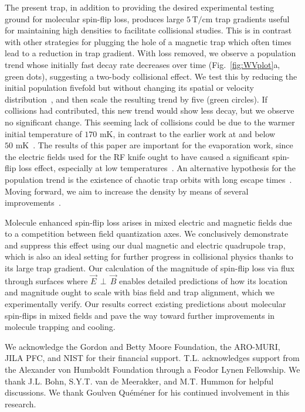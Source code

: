 \documentclass[%
 reprint,
 amsmath,amssymb,
 aps,
prl,
]{revtex4-1}
\newcommand{\epb}{{$\vec{E}\,{\perp}\,\vec{B}$}}
\begin{document}
The present trap, in addition to providing the desired experimental testing ground for molecular spin-flip loss, produces large $5\,\text{T/cm}$ trap gradients useful for maintaining high densities to facilitate collisional studies.
This is in contrast with other strategies for plugging the hole of a magnetic trap which often times lead to a reduction in trap gradient.
With loss removed, we observe a population trend whose initially fast decay rate decreases over time (Fig.~\ref{fig:WVplot}a, green dots), suggesting a two-body collisional effect.
We test this by reducing the initial population fivefold but without changing its spatial or velocity distribution~\cite{ssm}, and then scale the resulting trend by five (green circles). 
If collisions had contributed, this new trend would show less decay, but we observe no significant change.
This seeming lack of collisions could be due to the warmer initial temperature of $170\text{ mK}$, in contrast to the earlier work at and below $50\text{ mK}$~\cite{Stuhl2012evap}.
The results of this paper are important for the evaporation work, since the electric fields used for the RF knife ought to have caused a significant spin-flip loss effect, especially at low temperatures~\cite{ssm}.
An alternative hypothesis for the population trend is the existence of chaotic trap orbits with long escape times~\cite{Gonzalez-Ferez2014}.
Moving forward, we aim to increase the density by means of several improvements~\cite{Even2015,Segev2017}.

Molecule enhanced spin-flip loss arises in mixed electric and magnetic fields due to a competition between field quantization axes.
We conclusively demonstrate and suppress this effect using our dual magnetic and electric quadrupole trap, which is also an ideal setting for further progress in collisional physics thanks to its large trap gradient.
Our calculation of the magnitude of spin-flip loss via flux through surfaces where \epb{} enables detailed predictions of how its location and magnitude ought to scale with bias field and trap alignment, which we experimentally verify.
Our results correct existing predictions about molecular spin-flips in mixed fields and pave the way toward further improvements in molecule trapping and cooling.

\begin{acknowledgments}
We acknowledge the Gordon and Betty Moore Foundation, the ARO-MURI, JILA PFC, and NIST for their financial support. 
T.L. acknowledges support from the Alexander von Humboldt Foundation through a Feodor Lynen Fellowship. 
We thank J.L. Bohn, S.Y.T. van de Meerakker, and M.T. Hummon for helpful discussions. 
We thank Goulven Qu\'em\'ener for his continued involvement in this research.
\end{acknowledgments}



\end{document}
